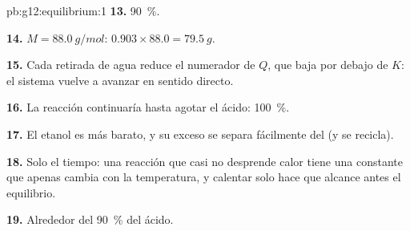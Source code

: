 \begin{solution}{pb:g12:equilibrium:1}
\textbf{13.} \qty{90}{\percent}.

\textbf{14.} $M = \qty{88.0}{g/mol}$: $0.903 \times 88.0 = \qty{79.5}{g}$.

\textbf{15.} Cada retirada de agua reduce el numerador de $Q$, que baja
por debajo de $K$: el sistema vuelve a avanzar en sentido directo.

\textbf{16.} La reacción continuaría hasta agotar el ácido:
\qty{100}{\percent}.

\textbf{17.} El etanol es más barato, y su exceso se separa fácilmente
del  (y se recicla).

\textbf{18.} Solo el tiempo: una reacción que casi no desprende calor
tiene una constante que apenas cambia con la temperatura, y calentar
solo hace que alcance antes el equilibrio.

\textbf{19.} Alrededor del \qty{90}{\percent} del ácido.
\end{solution}
